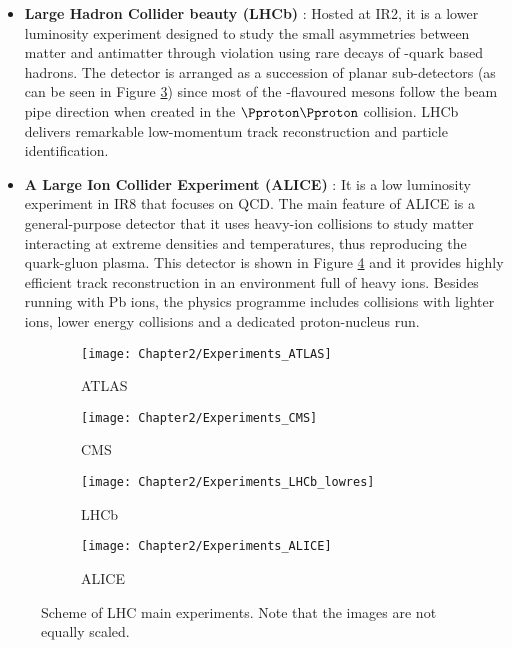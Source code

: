 \begin{itemize}
		
  \item \textbf{Large Hadron Collider beauty (LHCb)} \cite{LHCb:2008vvz}:
    		Hosted at IR2, it is a lower luminosity experiment designed to study the small asymmetries between matter and antimatter through \CP violation using rare decays
		of \Pbottom-quark based hadrons. 
		The detector is arranged as a succession of planar sub-detectors (as can be seen in Figure \ref{fig7:Chap2:LHC_experiments:LHCb})
		since most of the \Pbottom-flavoured mesons follow the beam pipe direction
		when created in the $\Pproton \Pproton$ collision. LHCb delivers remarkable low-momentum track reconstruction and particle identification. 

  \item \textbf{A Large Ion Collider Experiment (ALICE)} \cite{ALICE_Collaboration_2008}:
  		It is a low luminosity experiment in IR8 that focuses on QCD.%
		The main feature of ALICE is a  general-purpose detector that it uses heavy-ion collisions to 
		 study matter interacting at extreme densities and temperatures, thus reproducing the quark-gluon plasma.
		 This detector is shown in Figure \ref{fig7:Chap2:LHC_experiments:ALICE} and it provides highly efficient 
		 track reconstruction in an environment full of heavy ions.
		 Besides running with Pb ions, the physics programme includes collisions with lighter ions, lower energy collisions and a dedicated proton-nucleus run.

\end{itemize}


\begin{figure}[ht] 
  \begin{subfigure}[b]{0.5\linewidth}
    \centering
    \texttt{[image: Chapter2/Experiments\_ATLAS]} 
    \caption{ATLAS} 
    \label{fig7:Chap2:LHC_experiments:ATLAS} 
    \vspace{4ex}
  \end{subfigure}%
  \begin{subfigure}[b]{0.5\linewidth}
    \centering
   \texttt{[image: Chapter2/Experiments\_CMS]}
    \caption{CMS} 
    \label{fig7:Chap2:LHC_experiments:CMS} 
    \vspace{4ex}
  \end{subfigure} 
  \begin{subfigure}[b]{0.5\linewidth}
    \centering
    \texttt{[image: Chapter2/Experiments\_LHCb\_lowres]}
    \caption{LHCb} 
    \label{fig7:Chap2:LHC_experiments:LHCb} 
  \end{subfigure}%
  \begin{subfigure}[b]{0.5\linewidth}
    \centering
    \texttt{[image: Chapter2/Experiments\_ALICE]}
    \caption{ALICE} 
    \label{fig7:Chap2:LHC_experiments:ALICE} 
  \end{subfigure} 
  \caption{Scheme of LHC main experiments. Note that the images are not equally scaled.}
  \label{fig7:Chap2:LHC_experiments} 
\end{figure}

